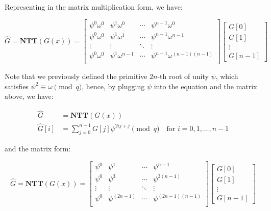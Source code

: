 \documentclass[12pt]{article}
\begin{document}
Representing in the matrix multiplication form, we have:

\begin{equation*}
    \hat{G} 
    = \mathbf{NTT}(G(x)) 
    = \begin{bmatrix}
        \psi^0 \omega^0 & \psi^1 \omega^0 & \cdots & \psi^{n-1} \omega^0 \\
        \psi^0 \omega^0 & \psi^1 \omega^1 & \cdots & \psi^{n-1} \omega^{n-1} \\
        \vdots & \vdots & \ddots & \vdots \\
        \psi^0 \omega^0 & \psi^1 \omega^{n-1} & \cdots & \psi^{n-1} \omega^{(n-1)(n-1)} \\
    \end{bmatrix}
    \begin{bmatrix}
        G[0] \\
        G[1] \\
        \vdots \\
        G[n-1]
    \end{bmatrix}
\end{equation*}

Note that we previously defined the primitive $2n$-th root of unity $\psi$, 
which satisfies $\psi^2 \equiv \omega \pmod{q}$, hence, 
by plugging $\psi$ into the equation and the matrix above, 
we have:

\begin{align*}
    \hat{G} &= \mathbf{NTT}(G(x)) \\
    \hat{G}[i]  &= \sum_{j = 0}^{n - 1} G[j] \psi^{2ij + j} \pmod{q} \quad \text{for } i = 0, 1, \ldots, n-1
\end{align*}

and the matrix form:

\begin{equation*}
    \hat{G} 
    = \mathbf{NTT}(G(x)) 
    = \begin{bmatrix}
        \psi^0 & \psi^1 & \cdots & \psi^{n-1} \\
        \psi^0 & \psi^3 & \cdots & \psi^{3(n-1)} \\
        \vdots & \vdots & \ddots & \vdots \\
        \psi^0 & \psi^{(2n-1)} & \cdots & \psi^{(2n-1)(n-1)} \\
    \end{bmatrix}
    \begin{bmatrix}
        G[0] \\
        G[1] \\
        \vdots \\
        G[n-1]
    \end{bmatrix}
\end{equation*}
\end{document}
